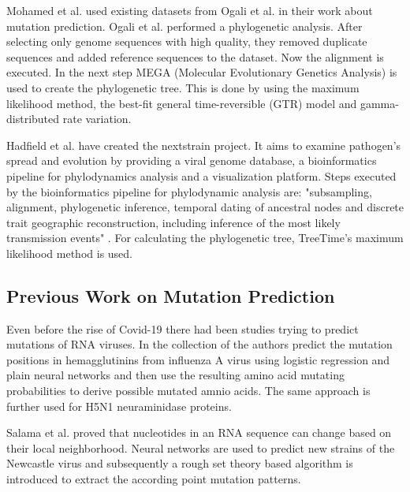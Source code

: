 Mohamed et al. \cite{Mohamed2021} used existing datasets from Ogali et al. \cite{ogaliMolecularCharacterizationNewcastle2018} in their work about mutation prediction. Ogali et al. \cite{ogaliMolecularCharacterizationNewcastle2018} performed a phylogenetic analysis. After selecting only genome sequences with high quality, they removed duplicate sequences and added reference sequences to the dataset. Now the alignment is executed. In the next step MEGA (Molecular Evolutionary Genetics Analysis) is used to create the phylogenetic tree. This is done by using the maximum likelihood method, the best-fit general time-reversible (GTR) model and gamma-distributed rate variation.

Hadfield et al. \cite{10.1093/bioinformatics/bty407} have created the nextstrain project. It aims to examine pathogen's spread and evolution by providing a viral genome database, a bioinformatics pipeline for phylodynamics analysis and a visualization platform. 
Steps executed by the bioinformatics pipeline for phylodynamic analysis are: "subsampling, alignment, phylogenetic inference, temporal dating of ancestral nodes and discrete trait geographic reconstruction, including inference of the most likely transmission events" \cite{10.1093/bioinformatics/bty407}. For calculating the phylogenetic tree, TreeTime's maximum likelihood method is used. \cite{10.1093/bioinformatics/bty407}



\subsection{Previous Work on Mutation Prediction} \label{fundamentalsD}

Even before the rise of Covid-19 there had been studies trying to predict mutations of \ac{RNA} viruses. In the collection of \cite{Wu2007, Yan2007, Wu2008} the authors predict the mutation positions in hemagglutinins from influenza A virus using logistic regression and plain neural networks and then use the resulting amino acid mutating probabilities to derive possible mutated amnio acids. The same approach is further used for H5N1 neuraminidase proteins. 

Salama et al. \cite{Salama2016} proved that nucleotides in an \ac{RNA} sequence can change based on their local neighborhood. Neural networks are used to predict new strains of the Newcastle virus and subsequently a rough set theory based algorithm is introduced to extract the according point mutation patterns. 


